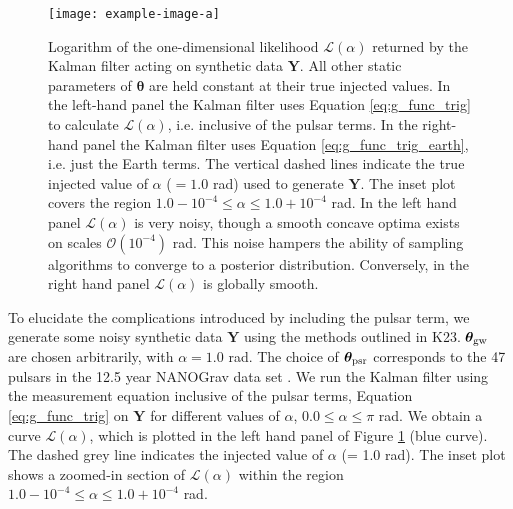 \documentclass[fleqn,usenatbib,useAMS]{mnras}
\begin{document}
\begin{figure}
	\texttt{[image: example-image-a]}
	\caption{Logarithm of the one-dimensional likelihood $\mathcal{L}(\alpha)$ returned by the Kalman filter acting on synthetic data $\boldsymbol{Y}$. All other static parameters of $\boldsymbol{\theta}$ are held constant at their true injected values. In the left-hand panel the Kalman filter uses Equation \eqref{eq:g_func_trig} to calculate $\mathcal{L}(\alpha)$, i.e. inclusive of the pulsar terms. In the right-hand panel the Kalman filter uses Equation \ref{eq:g_func_trig_earth}, i.e. just the Earth terms. The vertical dashed lines indicate the true injected value of $\alpha$ ($=1.0$ rad) used to generate $\boldsymbol{Y}$. The inset plot covers the region $1.0 - 10^{-4} \le \alpha \le 1.0 +10^{-4}$ rad. In the left hand panel $\mathcal{L}(\alpha)$ is very noisy, though a smooth concave optima exists on scales $\mathcal{O}(10^{-4})$ rad. This noise hampers the ability of sampling algorithms to converge to a posterior distribution. Conversely, in the right hand panel $\mathcal{L}(\alpha)$ is globally smooth. }
	\label{fig:likelihood_comparison}
\end{figure}




To elucidate the complications introduced by including the pulsar term, we generate some noisy synthetic data $\boldsymbol{Y}$ using the methods outlined in K23. $\boldsymbol{\theta}_{\rm gw}$ are chosen arbitrarily, with $\alpha = 1.0 $ rad.
The choice of $\boldsymbol{\theta}_{\rm psr}$ corresponds to the 47 pulsars in the 12.5 year NANOGrav data set  \citep{2020ApJ...905L..34A}. We run the Kalman filter using the measurement equation inclusive of the pulsar terms, Equation \eqref{eq:g_func_trig} on $\boldsymbol{Y}$ for different values of $\alpha$, $ 0.0 \le \alpha \le \pi$ rad. We obtain a curve $\mathcal{L}(\alpha)$, which is plotted in the left hand panel of Figure \ref{fig:likelihood_comparison} (blue curve). The dashed grey line indicates the injected value of $\alpha$ (= 1.0 rad). The inset plot shows a zoomed-in section of $\mathcal{L}(\alpha)$ within the region $ 1.0 - 10^{-4} \le \alpha \le 1.0 +10^{-4}$ rad. \newline 
\end{document}
